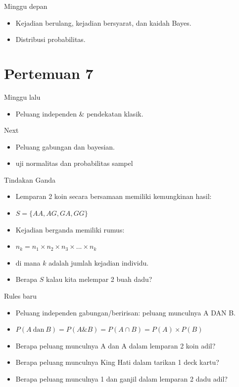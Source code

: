 \documentclass[
  ignorenonframetext,
]{beamer}
\providecommand{\tightlist}{%
  \setlength{\itemsep}{0pt}\setlength{\parskip}{0pt}}\usepackage{longtable,booktabs,array}
\begin{document}
\begin{frame}{Minggu depan}
\label{minggu-depan}
\begin{itemize}
\item
  Kejadian berulang, kejadian bersyarat, dan kaidah Bayes.
\item
  Distribusi probabilitas.
\end{itemize}
\end{frame}

\section{Pertemuan 7}\label{pertemuan-7}

\begin{frame}{Minggu lalu}
\label{minggu-lalu-1}
\begin{itemize}
\tightlist
\item
  Peluang independen \& pendekatan klasik.
\end{itemize}

\begin{block}{Next}
\label{next-1}
\begin{itemize}
\tightlist
\item
  Peluang gabungan dan bayesian.
\item
  uji normalitas dan probabilitas sampel
\end{itemize}
\end{block}
\end{frame}

\begin{frame}{Tindakan Ganda}
\label{tindakan-ganda}
\begin{itemize}[<+->]
\item
  Lemparan 2 koin secara bersamaan memiliki kemungkinan hasil:
\item
  \(S=\{AA,AG,GA,GG\}\)
\item
  Kejadian berganda memiliki rumus:
\item
  \(n_k=n_1 \times n_2 \times n_3 \times ... \times n_k\)
\item
  di mana \(k\) adalah jumlah kejadian individu.
\item
  Berapa \(S\) kalau kita melempar 2 buah dadu?
\end{itemize}
\end{frame}

\begin{frame}{Rules baru}
\label{rules-baru}
\begin{itemize}[<+->]
\item
  Peluang independen gabungan/beririsan: peluang munculnya A DAN B.
\item
  \(P(A \ \text{dan} \ B)=P(A\&B) = P(A \cap B) = P(A) \times P(B)\)
\item
  Berapa peluang munculnya A dan A dalam lemparan 2 koin adil?
\item
  Berapa peluang munculnya King Hati dalam tarikan 1 deck kartu?
\item
  Berapa peluang munculnya 1 dan ganjil dalam lemparan 2 dadu adil?
\end{itemize}
\end{frame}
\end{document}
